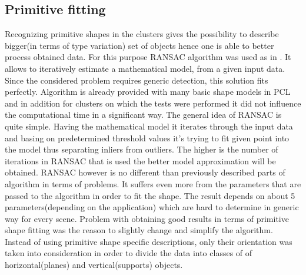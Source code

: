 \documentclass[fontsize=12pt]{article}
\begin{document}
\subsection{Primitive fitting}
Recognizing primitive shapes in the clusters gives the possibility to describe bigger(in terms of type variation) set of objects hence one is able to better process obtained data. For this purpose RANSAC algorithm was used as in \cite{pap1}. It allows to iteratively estimate a mathematical model, from a given input data. Since the considered problem requires generic detection, this solution fits perfectly. Algorithm is already provided with many basic shape models in PCL and in addition for clusters on which the tests were performed it did not influence the computational time in a significant way.
\newline
\indent The general idea of RANSAC is quite simple. Having the mathematical model it iterates through the input data and basing on predetermined threshold values it's trying to fit given point into the model thus separating inliers from outliers. The higher is the number of iterations in RANSAC that is used the better model approximation will be obtained.
\newline
\indent RANSAC however is no different than previously described parts of algorithm in terms of problems. It suffers even more from the parameters that are passed to the algorithm in order to fit the shape. The result depends on about 5 parameters(depending on the application) which are hard to determine in generic way for every scene. Problem with obtaining good results in terms of primitive shape fitting was the reason to slightly change and simplify the algorithm. Instead of using primitive shape specific descriptions, only their orientation was taken into consideration in order to divide the data into classes of of horizontal(planes) and vertical(supports) objects.  
\end{document}
